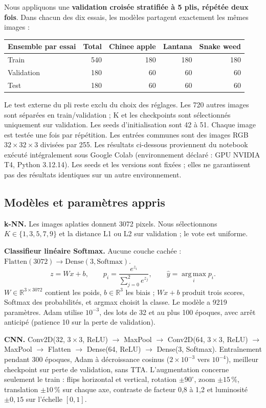 \documentclass[10pt,a4paper]{article}
\newcommand{\pct}{\,\%\xspace}
\begin{document}
Nous appliquons une \textbf{validation croisée stratifiée à 5 plis, répétée deux fois}.
Dans chacun des dix essais, les modèles partagent exactement les mêmes images :
\begin{center}\small
\begin{tabular}{lrrrr}\toprule
Ensemble par essai & Total & Chinee apple & Lantana & Snake weed\\\midrule
Train & 540 & 180 & 180 & 180\\
Validation & 180 & 60 & 60 & 60\\
Test & 180 & 60 & 60 & 60\\\bottomrule\end{tabular}
\end{center}
Le test externe du pli reste exclu du choix des réglages. Les 720 autres images sont séparées
en train/validation ; K et les checkpoints sont sélectionnés uniquement sur validation.
Les seeds d'initialisation sont 42 à 51. Chaque image est testée une fois par répétition.
Les entrées communes sont des images RGB $32\times32\times3$ divisées par 255.
Les résultats ci-dessous proviennent du notebook exécuté intégralement sous Google Colab
(environnement déclaré : GPU NVIDIA T4, Python 3.12.14). Les seeds et les versions sont
fixées ; elles ne garantissent pas des résultats identiques sur un autre environnement.

\subsection{Modèles et paramètres appris}
\textbf{k-NN.} Les images aplaties donnent 3072 pixels. Nous sélectionnons
$K\in\{1,3,5,7,9\}$ et la distance L1 ou L2 sur validation ; le vote est uniforme.

\textbf{Classifieur linéaire Softmax.} Aucune couche cachée :
$\mathrm{Flatten}(3072)\rightarrow\mathrm{Dense}(3,\mathrm{Softmax})$.
\[
z=Wx+b,\qquad p_i=\frac{e^{z_i}}{\sum_{j=0}^{2}e^{z_j}},\qquad
\widehat y=\operatorname*{arg\,max}_i p_i.
\]
$W\in\mathbb R^{3\times3072}$ contient les poids, $b\in\mathbb R^3$ les biais ; $Wx+b$
produit trois scores, Softmax des probabilités, et argmax choisit la classe.
Le modèle a 9219 paramètres. Adam utilise $10^{-3}$, des lots de 32 et au plus 100 époques,
avec arrêt anticipé (patience 10 sur la perte de validation).

\textbf{CNN.} Conv2D(32, $3\times3$, ReLU) $\rightarrow$ MaxPool $\rightarrow$
Conv2D(64, $3\times3$, ReLU) $\rightarrow$ MaxPool $\rightarrow$ Flatten $\rightarrow$
Dense(64, ReLU) $\rightarrow$ Dense(3, Softmax). Entraînement pendant 300 époques,
Adam à décroissance cosinus ($2\times10^{-3}$ vers $10^{-4}$), meilleur checkpoint sur
perte de validation, sans TTA. L'augmentation concerne seulement le train : flips horizontal
et vertical, rotation $\pm90^\circ$, zoom $\pm15\pct$, translation $\pm10\pct$ sur chaque axe,
contraste de facteur 0,8 à 1,2 et luminosité $\pm0{,}15$ sur l'échelle $[0,1]$.
\end{document}
